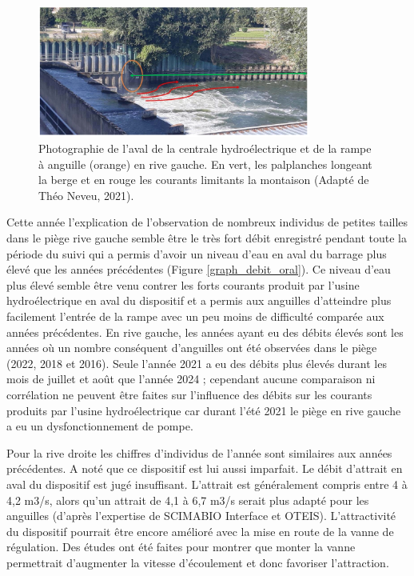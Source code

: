 \documentclass[11pt,titlepage,twoside]{article}\usepackage[]{graphicx}\usepackage[table]{xcolor}
\begin{document}
\begin{figure}[htpb]
\centering
\includegraphics[width=0.8\textwidth]{Discu.png}
\caption{Photographie de l’aval de la centrale hydroélectrique et de la rampe à anguille (orange) en rive gauche. En vert, les palplanches longeant la berge et en rouge les courants limitants la montaison (Adapté de Théo Neveu, 2021).}
\label{Discu}
\end{figure} 

\vspace{0.5cm}
Cette année l’explication de l’observation de nombreux individus de petites tailles dans le piège rive gauche semble être le très fort débit enregistré pendant toute la période du suivi qui a permis d’avoir un niveau d’eau en aval du barrage plus élevé que les années précédentes (Figure \ref{graph_debit_oral}). Ce niveau d’eau plus élevé semble être venu contrer les forts courants produit par l’usine hydroélectrique en aval du dispositif et a permis aux anguilles d’atteindre plus facilement l’entrée de la rampe avec un peu moins de difficulté comparée aux années précédentes. En rive gauche, les années ayant eu des débits élevés sont les années où un nombre conséquent d’anguilles ont été observées dans le piège (2022, 2018 et 2016). Seule l’année 2021 a eu des débits plus élevés durant les mois de juillet et août que l’année 2024 ; cependant aucune comparaison ni corrélation ne peuvent être faites sur l’influence des débits sur les courants produits par l’usine hydroélectrique car durant l’été 2021 le piège en rive gauche a eu un dysfonctionnement de pompe.

\vspace{0.5cm}
Pour la rive droite les chiffres d’individus de l’année sont similaires aux années précédentes. A noté que ce dispositif est lui aussi imparfait. Le débit d’attrait en aval du dispositif est jugé insuffisant.  L’attrait est généralement compris entre 4 à 4,2 m3/s, alors qu’un attrait de 4,1 à 6,7 m3/s serait plus adapté pour les anguilles (d’après l’expertise de SCIMABIO Interface et OTEIS). L’attractivité du dispositif pourrait être encore amélioré avec la mise en route de la vanne de régulation. Des études ont été faites pour montrer que monter la vanne permettrait d’augmenter la vitesse d’écoulement et donc favoriser l’attraction.
\end{document}

